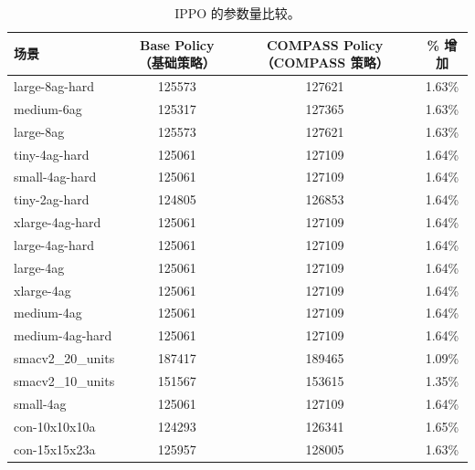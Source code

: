 \documentclass[11pt,UTF8,fontset=fandol]{ctexart}
\begin{document}
\begin{table}[H]\centering
\caption{IPPO 的参数量比较。}
\label{tab:9}
\begin{tabular}{lccc}
\toprule
场景 & Base Policy（基础策略） & COMPASS Policy（COMPASS 策略） & \% 增加\\
\midrule
large-8ag-hard & 125573 & 127621 & 1.63\%\\
medium-6ag & 125317 & 127365 & 1.63\%\\
large-8ag & 125573 & 127621 & 1.63\%\\
tiny-4ag-hard & 125061 & 127109 & 1.64\%\\
small-4ag-hard & 125061 & 127109 & 1.64\%\\
tiny-2ag-hard & 124805 & 126853 & 1.64\%\\
xlarge-4ag-hard & 125061 & 127109 & 1.64\%\\
large-4ag-hard & 125061 & 127109 & 1.64\%\\
large-4ag & 125061 & 127109 & 1.64\%\\
xlarge-4ag & 125061 & 127109 & 1.64\%\\
medium-4ag & 125061 & 127109 & 1.64\%\\
medium-4ag-hard & 125061 & 127109 & 1.64\%\\
smacv2\_20\_units & 187417 & 189465 & 1.09\%\\
smacv2\_10\_units & 151567 & 153615 & 1.35\%\\
small-4ag & 125061 & 127109 & 1.64\%\\
con-10x10x10a & 124293 & 126341 & 1.65\%\\
con-15x15x23a & 125957 & 128005 & 1.63\%\\
\bottomrule
\end{tabular}
\end{table}
\end{document}
